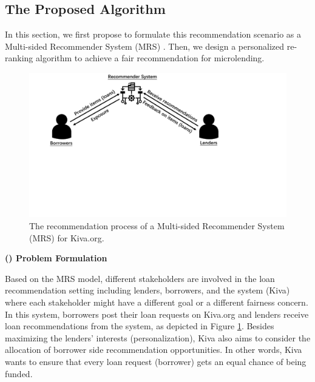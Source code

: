\subsection{The Proposed Algorithm}
\label{subsec:far_algorithm}
In this section, we first propose to formulate this recommendation scenario as a Multi-sided Recommender System (MRS) \cite{burke2017multisided, burke2017patterns}. Then, we design a personalized re-ranking algorithm to achieve a fair recommendation for microlending.

\begin{figure}[t]
\includegraphics[width=0.99\columnwidth]{imgs/far/mrs.pdf}
\caption{The recommendation process of a Multi-sided Recommender System (MRS) for Kiva.org.}
\label{fig:mrs}
\end{figure}

\vspace{0.25cm}
\noindent \textbf{() Problem Formulation}
\vspace{0.25cm}

Based on the MRS model, different stakeholders are involved in the loan recommendation setting including lenders, borrowers, and the system (Kiva) where each stakeholder might have a different goal or a different fairness concern. In this system, borrowers post their loan requests on Kiva.org and lenders receive loan recommendations from the system, as depicted in Figure \ref{fig:mrs}. 
Besides maximizing the lenders' interests (personalization), Kiva also aims to consider the allocation of borrower side recommendation opportunities. In other words, Kiva wants to ensure that every loan request (borrower) gets an equal chance of being funded.


